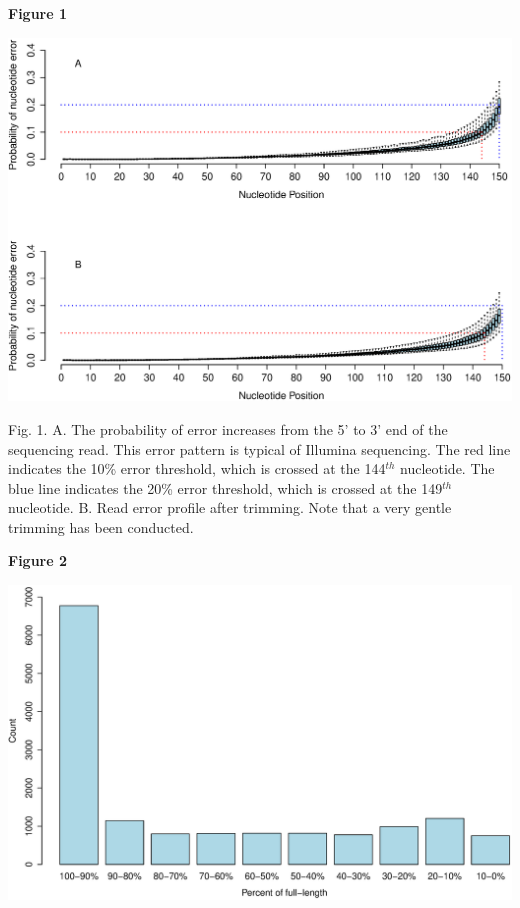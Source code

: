 \documentclass[10.5pt]{article}
\begin{document}
\textbf{\hypertarget{Figure 1}{Figure 1}} \\
\centerline{\includegraphics[width=40.0\baselineskip]{Figure1.eps}}


\noindent
Fig. 1. A. The probability of error increases from the 5' to 3' end of the sequencing read. This error pattern is typical of Illumina sequencing.  The red line indicates the 10\% error threshold, which is crossed at the 144$^{th}$ nucleotide. The blue line indicates the 20\% error threshold, which is crossed at the 149$^{th}$ nucleotide. B. Read error profile after trimming. Note that a very gentle trimming has been conducted. 


\vspace{40mm}
\textbf{\hypertarget{Figure 2}{Figure 2}} \\
\centerline{\includegraphics[width=40.0\baselineskip]{Figure2a.eps}}
\end{document}
